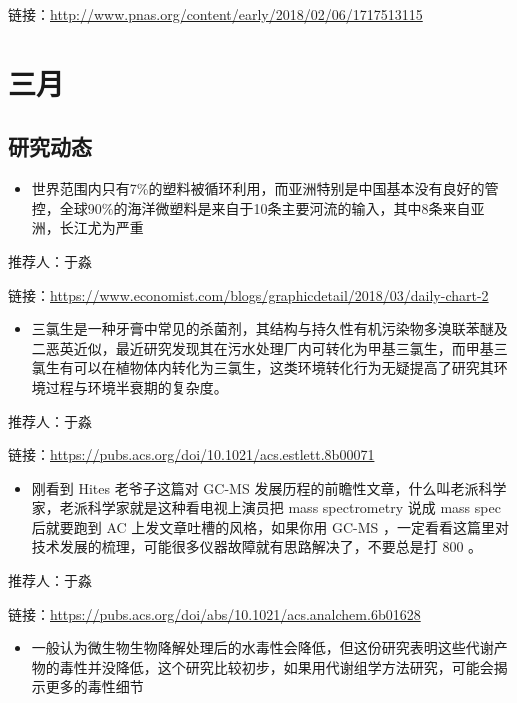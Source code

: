\documentclass[]{book}
\providecommand{\tightlist}{%
  \setlength{\itemsep}{0pt}\setlength{\parskip}{0pt}}
\begin{document}
链接：\url{http://www.pnas.org/content/early/2018/02/06/1717513115}

\section*{三月}

\subsection*{研究动态}\label{-4}

\begin{itemize}
\tightlist
\item
  世界范围内只有7\%的塑料被循环利用，而亚洲特别是中国基本没有良好的管控，全球90\%的海洋微塑料是来自于10条主要河流的输入，其中8条来自亚洲，长江尤为严重
\end{itemize}

推荐人：于淼

链接：\url{https://www.economist.com/blogs/graphicdetail/2018/03/daily-chart-2}

\begin{itemize}
\tightlist
\item
  三氯生是一种牙膏中常见的杀菌剂，其结构与持久性有机污染物多溴联苯醚及二恶英近似，最近研究发现其在污水处理厂内可转化为甲基三氯生，而甲基三氯生有可以在植物体内转化为三氯生，这类环境转化行为无疑提高了研究其环境过程与环境半衰期的复杂度。
\end{itemize}

推荐人：于淼

链接：\url{https://pubs.acs.org/doi/10.1021/acs.estlett.8b00071}

\begin{itemize}
\tightlist
\item
  刚看到 Hites 老爷子这篇对 GC-MS
  发展历程的前瞻性文章，什么叫老派科学家，老派科学家就是这种看电视上演员把
  mass spectrometry 说成 mass spec 后就要跑到 AC
  上发文章吐槽的风格，如果你用 GC-MS
  ，一定看看这篇里对技术发展的梳理，可能很多仪器故障就有思路解决了，不要总是打
  800 。
\end{itemize}

推荐人：于淼

链接：\url{https://pubs.acs.org/doi/abs/10.1021/acs.analchem.6b01628}

\begin{itemize}
\tightlist
\item
  一般认为微生物生物降解处理后的水毒性会降低，但这份研究表明这些代谢产物的毒性并没降低，这个研究比较初步，如果用代谢组学方法研究，可能会揭示更多的毒性细节
\end{itemize}
\end{document}
